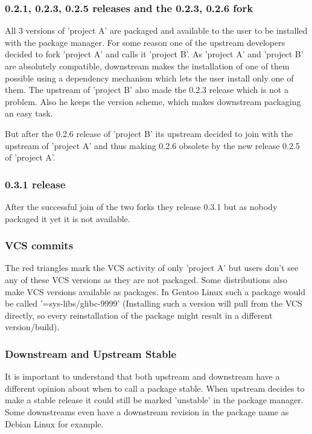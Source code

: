 \documentclass[a4paper,10pt]{article}
\begin{document}
\subsubsection*{0.2.1, 0.2.3, 0.2.5 releases and the 0.2.3, 0.2.6 fork}
All 3 versions of 'project A' are packaged and available to the user to be installed with the package manager. For some reason one of the upstream developers decided to fork 'project A' and calls it 'project B'. As 'project A' and 'project B' are absolutely compatible, downstream makes the installation of one of them possible using a dependency mechanism which lets the user install only one of them. The upstream of 'project B' also made the 0.2.3 release which is not a problem. Also he keeps the version scheme, which makes downstream packaging an easy task.

But after the 0.2.6 release of 'project B' its upstream decided to join with the upstream of 'project A' and thus making 0.2.6 obsolete by the new release 0.2.5 of 'project A'.

\subsubsection*{0.3.1 release}
After the successful join of the two forks they release 0.3.1 but as nobody packaged it yet it is not available.

\subsubsection*{VCS commits}
The red triangles mark the VCS activity of only 'project A' but users don't see any of these VCS versions as they are not packaged. Some distributions also make VCS versions available as packages. In Gentoo Linux such a package would be called '=sys-libs/glibc-9999' (Installing such a version will pull from the VCS directly, so every reinstallation of the package might result in a different version/build). 

\subsubsection*{Downstream and Upstream Stable}
It is important to understand that both upstream and downstream have a different opinion about when to call a package stable. When upstream decides to make a stable release it could still be marked 'unstable' in the package manager. Some downstreams even have a downstream revision in the package name as Debian Linux for example.
\end{document}
